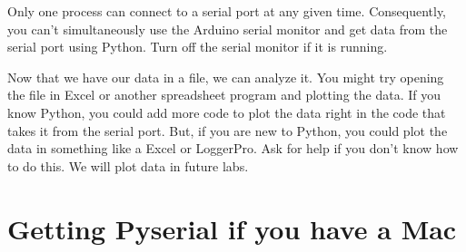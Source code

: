 
%
% 
%    

Only one process can connect to a serial port at any given time. Consequently,
you can't simultaneously
use the Arduino serial monitor and get data from the serial port
using Python. Turn off the serial monitor if it is
running.

Now that we have our data in a file, we can analyze it. You might try
opening the file in Excel or another spreadsheet program and plotting the
data. If you know Python, you could add more code to plot the data right in
the code that takes it from the serial port. But, if you are new to Python,
you could plot the data in something like a Excel or LoggerPro. Ask for help
if you don't know how to do this. We will plot data in future labs.

\section{Getting Pyserial if you have a Mac}

